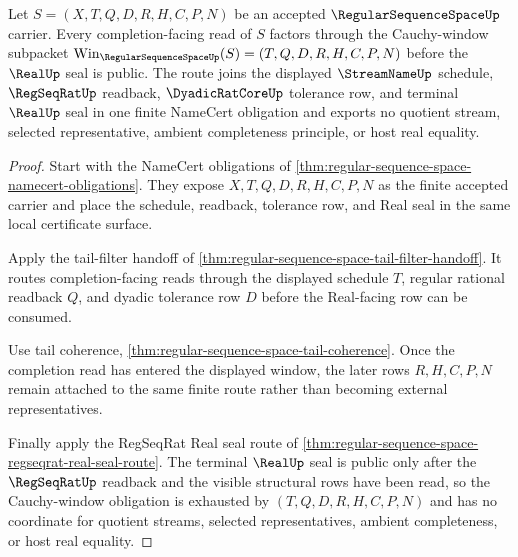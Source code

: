 \begin{theorem}
\label{thm:regular-sequence-space-cauchy-window-namecert-route}
Let $S=(X,T,Q,D,R,H,C,P,N)$ be an accepted $\RegularSequenceSpaceUp$ carrier. Every completion-facing read of $S$ factors through the Cauchy-window subpacket $\mathrm{Win}_{\RegularSequenceSpaceUp}(S)=(T,Q,D,R,H,C,P,N)$ before the $\RealUp$ seal is public. The route joins the displayed $\StreamNameUp$ schedule, $\RegSeqRatUp$ readback, $\DyadicRatCoreUp$ tolerance row, and terminal $\RealUp$ seal in one finite NameCert obligation and exports no quotient stream, selected representative, ambient completeness principle, or host real equality.
\end{theorem}
\begin{proof}
Start with the NameCert obligations of \autoref{thm:regular-sequence-space-namecert-obligations}. They expose $X,T,Q,D,R,H,C,P,N$ as the finite accepted carrier and place the schedule, readback, tolerance row, and Real seal in the same local certificate surface.

Apply the tail-filter handoff of \autoref{thm:regular-sequence-space-tail-filter-handoff}. It routes completion-facing reads through the displayed schedule $T$, regular rational readback $Q$, and dyadic tolerance row $D$ before the Real-facing row can be consumed.

Use tail coherence, \autoref{thm:regular-sequence-space-tail-coherence}. Once the completion read has entered the displayed window, the later rows $R,H,C,P,N$ remain attached to the same finite route rather than becoming external representatives.

Finally apply the RegSeqRat Real seal route of \autoref{thm:regular-sequence-space-regseqrat-real-seal-route}. The terminal $\RealUp$ seal is public only after the $\RegSeqRatUp$ readback and the visible structural rows have been read, so the Cauchy-window obligation is exhausted by $(T,Q,D,R,H,C,P,N)$ and has no coordinate for quotient streams, selected representatives, ambient completeness, or host real equality.
\end{proof}

